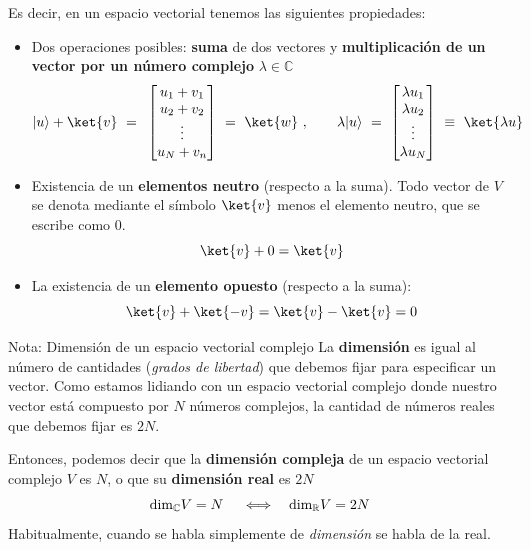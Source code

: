 \documentclass[a4paper,11pt]{book} %
\numberwithin{equation}{chapter}
\begin{document}
Es decir,  en un espacio vectorial  tenemos las siguientes propiedades:
	\begin{itemize}
	\item Dos operaciones posibles: \textbf{suma }de dos vectores y \textbf{multiplicación de un vector por un número complejo }$\lambda\in {\mathbb C}$
	\begin{equation}
 |u\rangle + \ket{v}~ =~\, 
\begin{bmatrix} {u_1}+v_1\\ {u_2}+v_2\\ \vdots \\ {u_N}+v_n \end{bmatrix} ~= ~\ket{w}\ , \qquad \lambda|u\rangle ~ =~   \begin{bmatrix} {\lambda u_1}\\ {\lambda u_2}\\ \vdots \\ {\lambda u_N} \end{bmatrix} ~\equiv~\ket{\lambda u}
	\end{equation}
	
	\item Existencia de un \textbf{elementos neutro} (respecto a la suma). Todo vector de $V$ se denota mediante el símbolo $\ket{v}$ menos el elemento neutro, que se escribe como $0$.
		\begin{equation}
			\ket{v} + 0 = \ket{v}
		\end{equation}
	
	\item La existencia de un \textbf{elemento opuesto} (respecto a la suma):
		\begin{equation}
		\ket{v} + \ket{-v} = \ket{v}-\ket{v} = 0
		\end{equation}
	\end{itemize}

	\begin{mybox_blue}{Nota: Dimensión de un espacio vectorial complejo}
	La \textbf{dimensión} es igual al número de cantidades (\textit{grados de libertad}) que debemos fijar para especificar un vector. Como estamos lidiando con un espacio vectorial complejo donde nuestro vector está compuesto por $N$ números complejos, la cantidad de números reales que debemos fijar es $2N$.
   \vspace{0.3cm}
   
Entonces, podemos decir que la \textbf{dimensión compleja} de un espacio vectorial complejo $V$ es $N$, o que su \textbf{dimensión real} es $2N$ 
	\begin{equation}
	{\rm dim}_{\mathbb C} V = N ~~~~\Longleftrightarrow ~~~   {\rm dim}_{\mathbb R} V = 2N
	\end{equation}
Habitualmente, cuando se habla simplemente de \textit{dimensión} se habla de la real.
	\end{mybox_blue}	
	
\end{document}
